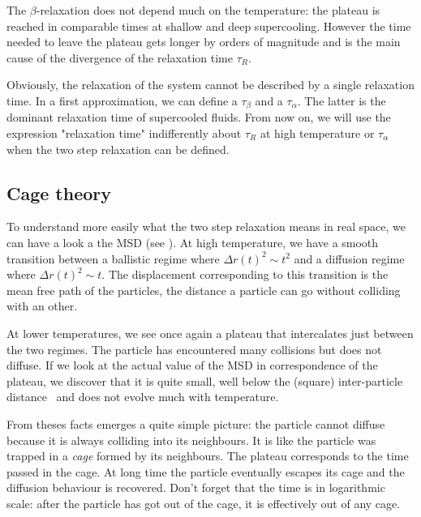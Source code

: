 The $\beta$-relaxation does not depend much on the temperature: the plateau is reached in comparable times at shallow and deep supercooling. However the time needed to leave the plateau gets longer by orders of magnitude and is the main cause of the divergence of the relaxation time $\tau_R$.

Obviously, the relaxation of the system cannot be described by a single relaxation time. In a first approximation, we can define a $\tau_\beta$ and a $\tau_\alpha$. The latter is the dominant relaxation time of supercooled fluids. From now on, we will use the expression "relaxation time" indifferently about $\tau_R$ at high temperature or $\tau_\alpha$ when the two step relaxation can be defined.


\subsection{Cage theory}
\label{sec:cage}

To understand more easily what the two step relaxation means in real space, we can have a look a the \ac{MSD} (see ). At high temperature, we have a smooth transition between a ballistic regime where $\Delta r(t)^2 \sim t^2$ and a diffusion regime where $\Delta r(t)^2 \sim t$. The displacement corresponding to this transition is the mean free path of the particles,  the distance a particle can go without colliding with an other.

At lower temperatures, we see once again a plateau that intercalates just between the two regimes. The particle has encountered many collisions but does not diffuse. If we look at the actual value of the \ac{MSD} in correspondence of the plateau, we discover that it is quite small, well below the (square) inter-particle distance~\citep{kob1995tmc} and does not evolve much with temperature.

From theses facts emerges a quite simple picture: the particle cannot diffuse because it is always colliding into its neighbours. It is like the particle was trapped in a \emph{cage} formed by its neighbours. The plateau corresponds to the time passed in the cage. At long time the particle eventually escapes its cage and the diffusion behaviour is recovered. Don't forget that the time is in logarithmic scale: after the particle has got out of the cage, it is effectively out of any cage.

